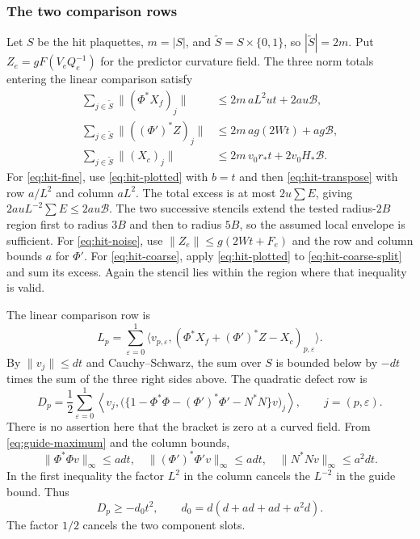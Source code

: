\subsubsection{The two comparison rows}
Let $S$ be the hit plaquettes, $m=|S|$, and
$\widetilde S=S\times\{0,1\}$, so $|\widetilde S|=2m$. Put
$Z_e=gF(V_eQ_e^{-1})$ for the predictor curvature field. The three
norm totals entering the linear comparison satisfy
\begin{align}
 \sum_{j\in\widetilde S}\|(\Phi^*X_f)_j\|
   &\le2m\,aL^2ut+2au\mathcal B,\label{eq:hit-fine}\\
 \sum_{j\in\widetilde S}\|((\Phi')^*Z)_j\|
   &\le2m\,ag(2Wt)+ag\mathcal B,\label{eq:hit-noise}\\
 \sum_{j\in\widetilde S}\|(X_c)_j\|
   &\le2m\,v_0r_*t+2v_0H_*\mathcal B.\label{eq:hit-coarse}
\end{align}
For \eqref{eq:hit-fine}, use \eqref{eq:hit-plotted} with $b=t$ and
then \eqref{eq:hit-transpose} with row $a/L^2$ and column $aL^2$.
The total excess is at most $2u\sum E$, giving
$2auL^{-2}\sum E\le2au\mathcal B$. The two successive stencils
extend the tested radius-$2B$ region first to radius $3B$ and then
to radius $5B$, so the assumed local envelope is sufficient.
For \eqref{eq:hit-noise}, use $\|Z_e\|\le g(2Wt+F_e)$ and the
row and column bounds $a$ for $\Phi'$. For
\eqref{eq:hit-coarse}, apply \eqref{eq:hit-plotted} to
\eqref{eq:hit-coarse-split} and sum its excess. Again the stencil
lies within the region where that inequality is valid.

The linear comparison row is
\[
 L_p=\sum_{\varepsilon=0}^1
  \langle v_{p,\varepsilon},
       (\Phi^*X_f+ (\Phi')^*Z-X_c)_{p,\varepsilon}\rangle.
\]
By $\|v_j\|\le dt$ and Cauchy--Schwarz, the sum over $S$ is bounded
below by $-dt$ times the sum of the three right sides above. The
quadratic defect row is
\[
 D_p=\frac12\sum_{\varepsilon=0}^1
  \left\langle v_j,
    \bigl(\{1-\Phi^*\Phi-(\Phi')^*\Phi'-N^*N\}v\bigr)_j\right\rangle,
 \qquad j=(p,\varepsilon).
\]
There is no assertion here that the bracket is zero at a curved
field. From \eqref{eq:guide-maximum} and the column bounds,
\[
 \|\Phi^*\Phi v\|_\infty\le adt,\quad
 \|(\Phi')^*\Phi'v\|_\infty\le adt,\quad
 \|N^*Nv\|_\infty\le a^2dt.
\]
In the first inequality the factor $L^2$ in the column cancels the
$L^{-2}$ in the guide bound. Thus
\begin{equation}\label{eq:hit-defect}
 D_p\ge-d_0t^2,\qquad d_0=d(d+ad+ad+a^2d).
\end{equation}
The factor $1/2$ cancels the two component slots.

